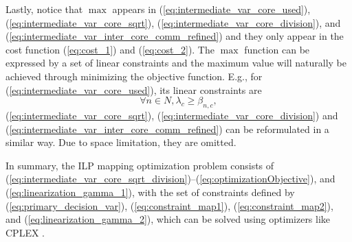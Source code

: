 Lastly, notice that $\max$ appears in (\ref{eq:intermediate_var_core_used}), (\ref{eq:intermediate_var_core_sqrt}), (\ref{eq:intermediate_var_core_division}), and (\ref{eq:intermediate_var_inter_core_comm_refined}) and they only appear in the cost function (\ref{eq:cost_1}) and (\ref{eq:cost_2}). The $\max$ function can be expressed by a set of linear constraints and the maximum value will naturally be achieved through minimizing the objective function.   
%
E.g., for (\ref{eq:intermediate_var_core_used}), 
its linear constraints are %
%
\begin{equation}\label{eq:intermediate_var_core_used_linearization}
\forall n \in N, \lambda_c \ge \beta_{n,c},
\end{equation}
%
(\ref{eq:intermediate_var_core_sqrt}), (\ref{eq:intermediate_var_core_division}) and (\ref{eq:intermediate_var_inter_core_comm_refined}) can be reformulated in a similar way. Due to space limitation, they are omitted.
%
%
%
%
%
%
%

In summary, the ILP mapping optimization problem consists of 
%
(\ref{eq:intermediate_var_core_sqrt_division})\nobreakdash--(\ref{eq:optimizationObjective}),  and (\ref{eq:linearization_gamma_1}), 
%
with the set of constraints defined by 
%
(\ref{eq:primary_decision_var}), (\ref{eq:constraint_map1}), (\ref{eq:constraint_map2}), and (\ref{eq:linearization_gamma_2}), %
%
which can be solved using 
optimizers 
like CPLEX \cite{cplex}. 



